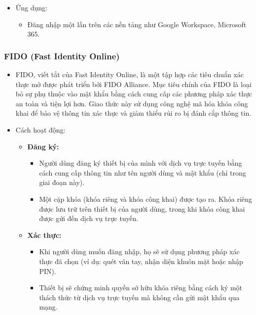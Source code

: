 \begin{itemize}
\begin{itemize}
    \end{itemize}
    \item Ứng dụng:
    \begin{itemize}
        \item Đăng nhập một lần trên các nền tảng như Google Workspace, Microsoft 365.
    \end{itemize}
\end{itemize}

\subsubsection{FIDO (Fast Identity Online)}
\begin{itemize}
    \item FIDO, viết tắt của Fast Identity Online, là một tập hợp các tiêu chuẩn xác thực mở được phát triển bởi FIDO Alliance. Mục tiêu chính của FIDO là loại bỏ sự phụ thuộc vào mật khẩu bằng cách cung cấp các phương pháp xác thực an toàn và tiện lợi hơn. Giao thức này sử dụng công nghệ mã hóa khóa công khai để bảo vệ thông tin xác thực và giảm thiểu rủi ro bị đánh cắp thông tin.

    \item Cách hoạt động:
    \begin{itemize}
        \item \textbf{Đăng ký:}
        \begin{itemize}
            \item Người dùng đăng ký thiết bị của mình với dịch vụ trực tuyến bằng cách cung cấp thông tin như tên người dùng và mật khẩu (chỉ trong giai đoạn này).
            \item Một cặp khóa (khóa riêng và khóa công khai) được tạo ra. Khóa riêng được lưu trữ trên thiết bị của người dùng, trong khi khóa công khai được gửi đến dịch vụ trực tuyến.

        \end{itemize}

        \item \textbf{Xác thực:}
        \begin{itemize}
            \item Khi người dùng muốn đăng nhập, họ sẽ sử dụng phương pháp xác thực đã chọn (ví dụ: quét vân tay, nhận diện khuôn mặt hoặc nhập PIN).

            \item Thiết bị sẽ chứng minh quyền sở hữu khóa riêng bằng cách ký một thách thức từ dịch vụ trực tuyến mà không cần gửi mật khẩu qua mạng.
        \end{itemize}


\end{itemize}
\end{itemize}
